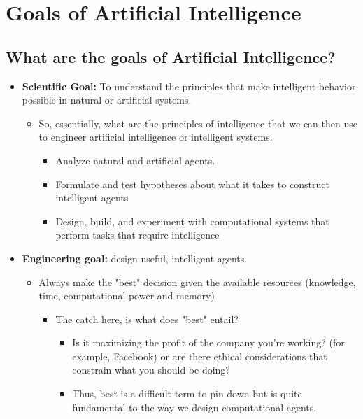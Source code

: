 \documentclass[12pt]{article}
\begin{document}
\newpage
\section*{Goals of Artificial Intelligence}

\subsection*{What are the goals of Artificial Intelligence?}

\begin{itemize}
    \item \textbf{Scientific Goal:} To understand the principles that make intelligent behavior possible in natural or artificial systems.
    \begin{itemize}
        \item So, essentially, what are the principles of intelligence that we can then use to engineer artificial intelligence or intelligent systems.
        \begin{itemize}
            \item Analyze natural and artificial agents.
            \item Formulate and test hypotheses about what it takes to construct intelligent agents
            \item Design, build, and experiment with computational systems that perform tasks that require intelligence
        \end{itemize}
    \end{itemize}
    \item \textbf{Engineering goal:} design useful, intelligent agents.
    \begin{itemize}
        \item Always make the "best" decision given the available resources (knowledge, time, computational power and memory)
        \begin{itemize}
            \item The catch here, is what does "best" entail?
            \begin{itemize}
                \item Is it maximizing the profit of the company you're working? (for example, Facebook) or are there ethical considerations that constrain what you should be doing?
                \item Thus, best is a difficult term to pin down but is quite fundamental to the way we design computational agents. 
            \end{itemize}

\end{itemize}
\end{itemize}
\end{itemize}
\end{document}
